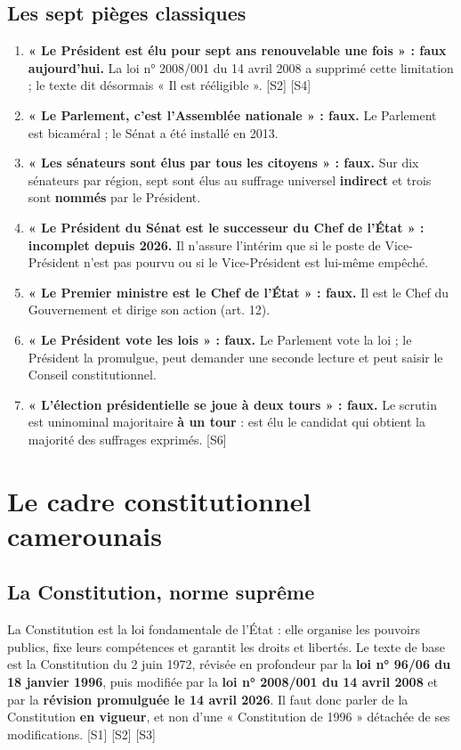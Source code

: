 \documentclass[11pt,a4paper,oneside]{report}
\newcommand{\src}[1]{\textcolor{bluec}{\scriptsize[#1]}}
\begin{document}
\section{Les sept pièges classiques}
\begin{enumerate}
  \item \textbf{« Le Président est élu pour sept ans renouvelable une fois » : faux aujourd'hui.} La loi n° 2008/001 du 14 avril 2008 a supprimé cette limitation ; le texte dit désormais « Il est rééligible ». \src{S2} \src{S4}
  \item \textbf{« Le Parlement, c'est l'Assemblée nationale » : faux.} Le Parlement est bicaméral ; le Sénat a été installé en 2013.
  \item \textbf{« Les sénateurs sont élus par tous les citoyens » : faux.} Sur dix sénateurs par région, sept sont élus au suffrage universel \textbf{indirect} et trois sont \textbf{nommés} par le Président.
  \item \textbf{« Le Président du Sénat est le successeur du Chef de l'État » : incomplet depuis 2026.} Il n'assure l'intérim que si le poste de Vice-Président n'est pas pourvu ou si le Vice-Président est lui-même empêché.
  \item \textbf{« Le Premier ministre est le Chef de l'État » : faux.} Il est le Chef du Gouvernement et dirige son action (art. 12).
  \item \textbf{« Le Président vote les lois » : faux.} Le Parlement vote la loi ; le Président la promulgue, peut demander une seconde lecture et peut saisir le Conseil constitutionnel.
  \item \textbf{« L'élection présidentielle se joue à deux tours » : faux.} Le scrutin est uninominal majoritaire \textbf{à un tour} : est élu le candidat qui obtient la majorité des suffrages exprimés. \src{S6}
\end{enumerate}
\chapter{Le cadre constitutionnel camerounais}
\section{La Constitution, norme suprême}
La Constitution est la loi fondamentale de l'État : elle organise les pouvoirs publics, fixe leurs compétences et garantit les droits et libertés. Le texte de base est la Constitution du 2 juin 1972, révisée en profondeur par la \textbf{loi n° 96/06 du 18 janvier 1996}, puis modifiée par la \textbf{loi n° 2008/001 du 14 avril 2008} et par la \textbf{révision promulguée le 14 avril 2026}. Il faut donc parler de la Constitution \textbf{en vigueur}, et non d'une « Constitution de 1996 » détachée de ses modifications. \src{S1} \src{S2} \src{S3}
\end{document}
